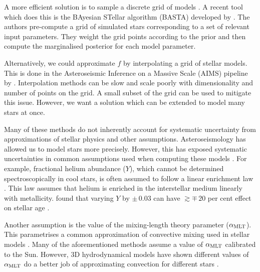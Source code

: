 A more efficient solution is to sample a discrete grid of models \citep{Gruberbauer.Guenther.ea2012,Gruberbauer.Guenther.ea2013}. A recent tool which does this is the BAyesian STellar algorithm (BASTA) developed by \citet{AguirreBorsen-Koch.Rorsted.ea2022}. The authors pre-compute a grid of simulated stars corresponding to a set of relevant input parameters. They weight the grid points according to the prior and then compute the marginalised posterior for each model parameter.

Alternatively, we could approximate \(f\) by interpolating a grid of stellar models. This is done in the Asteroseismic Inference on a Massive Scale (AIMS) pipeline by \citet{Lund.Reese2018,Rendle.Buldgen.ea2019}. Interpolation methods can be slow and scale poorly with dimensionality and number of points on the grid. A small subset of the grid can be used to mitigate this issue. However, we want a solution which can be extended to model many stars at once.

Many of these methods do not inherently account for systematic uncertainty from approximations of stellar physics and other assumptions. Asteroseismology has allowed us to model stars more precisely. However, this has exposed systematic uncertainties in common assumptions used when computing these models \citep[e.g.][]{Tayar.Claytor.ea2022}. For example, fractional helium abundance (\(Y\)), which cannot be determined spectroscopically in cool stars, is often assumed to follow a linear enrichment law \needcite. This law assumes that helium is enriched in the interstellar medium linearly with metallicity. \citet{Lebreton.Goupil.ea2014} found that varying \(Y\) by \(\pm\,0.03\) can have \(\gtrsim \mp\,20\) per cent effect on stellar age \citep{Lebreton.Goupil.ea2014}. 

Another assumption is the value of the mixing-length theory parameter (\({\alpha_\mathrm{MLT}}\)). This parametrises a common approximation of convective mixing used in stellar models \citep{Gough1977}. Many of the aforementioned methods assume a value of \({\alpha_\mathrm{MLT}}\) calibrated to the Sun. However, 3D hydrodynamical models have shown different values of \({\alpha_\mathrm{MLT}}\) do a better job of approximating convection for different stars \citep{Magic.Weiss.ea2015}.


